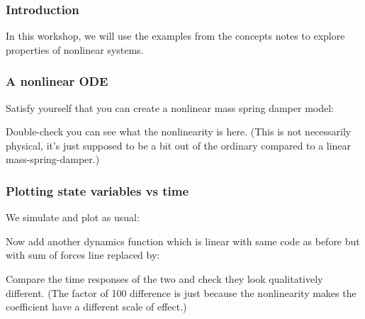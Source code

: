 \documentclass[9pt]{beamer-control}
\begin{document}

\begin{frame}
\frametitle{Introduction}
In this workshop, we will use the examples from the concepts notes to explore properties of nonlinear systems.
\end{frame}


\begin{frame}
\frametitle{A nonlinear ODE}

Satisfy yourself that you can create a nonlinear mass spring damper model:


Double-check you can see what the nonlinearity is here. (This is not necessarily physical, it's just supposed to be a bit out of the ordinary compared to a linear mass-spring-damper.)

\end{frame}

\begin{frame}
\frametitle{Plotting state variables vs time}
We simulate and plot as usual:


Now add another dynamics function which is linear with same code as before but with sum of forces line replaced by:


Compare the time responses of the two and check they look qualitatively different. (The factor of 100 difference is just because the nonlinearity makes the coefficient have a different scale of effect.)

\end{frame}
\end{document}
